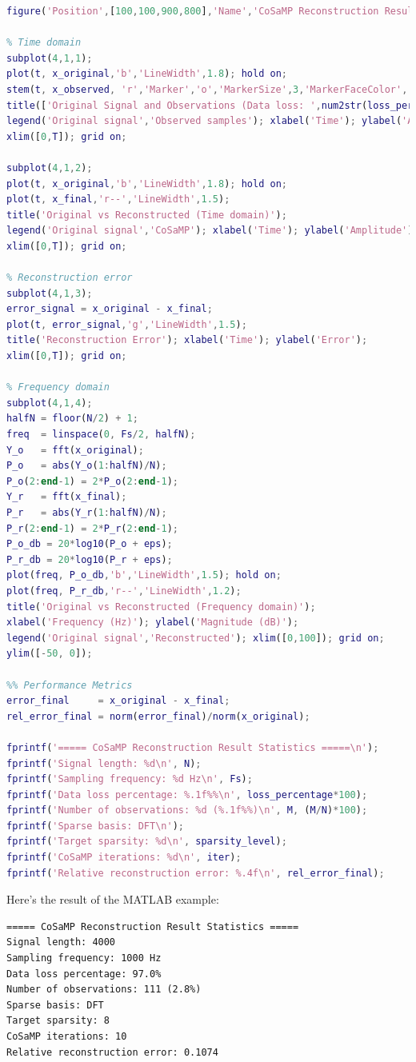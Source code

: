 \documentclass[12pt]{ctexart}
\begin{document}
\begin{lstlisting}[language=Matlab]
%% Result Visualization
figure('Position',[100,100,900,800],'Name','CoSaMP Reconstruction Results');

% Time domain
subplot(4,1,1);
plot(t, x_original,'b','LineWidth',1.8); hold on;
stem(t, x_observed, 'r','Marker','o','MarkerSize',3,'MarkerFaceColor','r');
title(['Original Signal and Observations (Data loss: ',num2str(loss_percentage*100),'%, Noise level: ',num2str(noise_level),')']);
legend('Original signal','Observed samples'); xlabel('Time'); ylabel('Amplitude');
xlim([0,T]); grid on;

subplot(4,1,2);
plot(t, x_original,'b','LineWidth',1.8); hold on;
plot(t, x_final,'r--','LineWidth',1.5);
title('Original vs Reconstructed (Time domain)');
legend('Original signal','CoSaMP'); xlabel('Time'); ylabel('Amplitude');
xlim([0,T]); grid on;

% Reconstruction error
subplot(4,1,3);
error_signal = x_original - x_final;
plot(t, error_signal,'g','LineWidth',1.5);
title('Reconstruction Error'); xlabel('Time'); ylabel('Error');
xlim([0,T]); grid on;

% Frequency domain
subplot(4,1,4);
halfN = floor(N/2) + 1;
freq  = linspace(0, Fs/2, halfN);
Y_o   = fft(x_original);
P_o   = abs(Y_o(1:halfN)/N);
P_o(2:end-1) = 2*P_o(2:end-1);
Y_r   = fft(x_final);
P_r   = abs(Y_r(1:halfN)/N);
P_r(2:end-1) = 2*P_r(2:end-1);
P_o_db = 20*log10(P_o + eps);
P_r_db = 20*log10(P_r + eps);
plot(freq, P_o_db,'b','LineWidth',1.5); hold on;
plot(freq, P_r_db,'r--','LineWidth',1.2);
title('Original vs Reconstructed (Frequency domain)');
xlabel('Frequency (Hz)'); ylabel('Magnitude (dB)');
legend('Original signal','Reconstructed'); xlim([0,100]); grid on;
ylim([-50, 0]);

%% Performance Metrics
error_final     = x_original - x_final;
rel_error_final = norm(error_final)/norm(x_original);

fprintf('===== CoSaMP Reconstruction Result Statistics =====\n');
fprintf('Signal length: %d\n', N);
fprintf('Sampling frequency: %d Hz\n', Fs);
fprintf('Data loss percentage: %.1f%%\n', loss_percentage*100);
fprintf('Number of observations: %d (%.1f%%)\n', M, (M/N)*100);
fprintf('Sparse basis: DFT\n');
fprintf('Target sparsity: %d\n', sparsity_level);
fprintf('CoSaMP iterations: %d\n', iter);
fprintf('Relative reconstruction error: %.4f\n', rel_error_final);
\end{lstlisting}

Here's the result of the MATLAB example:

\begin{verbatim}
===== CoSaMP Reconstruction Result Statistics =====
Signal length: 4000
Sampling frequency: 1000 Hz
Data loss percentage: 97.0%
Number of observations: 111 (2.8%)
Sparse basis: DFT
Target sparsity: 8
CoSaMP iterations: 10
Relative reconstruction error: 0.1074
\end{verbatim}
\end{document}
